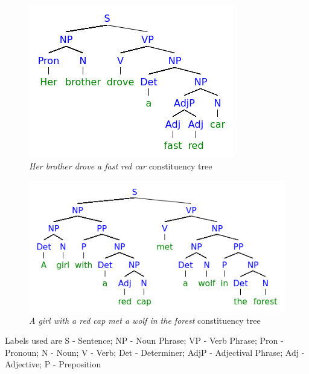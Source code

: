 \documentclass{article}
\begin{document}
\section{}
\subsection{}
\begin{figure}[h!]
	\includegraphics[width=\linewidth]{2ai.png}
	\caption{\textit{Her brother drove a fast red car} constituency tree}
	\label{fig:2ai}
\end{figure}

\begin{figure}[h!]
	\includegraphics[width=\linewidth]{2aii.png}
	\caption{\textit{A girl with a red cap met a wolf in the forest}
	constituency tree}
	\label{fig:2aii}
\end{figure}

Labels used are S - Sentence;
NP - Noun Phrase;
VP - Verb Phrase;
Pron - Pronoun;
N - Noun;
V - Verb;
Det - Determiner;
AdjP - Adjectival Phrase;
Adj - Adjective;
P - Preposition
\end{document}
